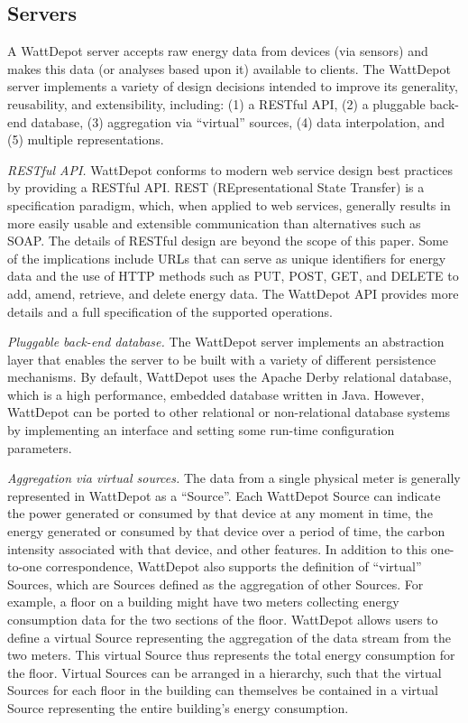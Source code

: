 \documentclass[conference]{IEEEtran}
\begin{document}
\subsection{Servers}

A WattDepot server accepts raw energy data from devices (via sensors) and
makes this data (or analyses based upon it) available to clients.  The
WattDepot server implements a variety of design decisions intended to
improve its generality, reusability, and extensibility, including: (1) a
RESTful API, (2) a pluggable back-end database, (3) aggregation via
``virtual'' sources, (4) data interpolation, and (5) multiple
representations.

{\em RESTful API.} WattDepot conforms to modern web service design best
practices by providing a RESTful API.  REST (REpresentational State
Transfer) \cite{REST} is a specification paradigm, which, when applied to
web services, generally results in more easily usable and extensible
communication than alternatives such as SOAP. The details of RESTful design
are beyond the scope of this paper. Some of the implications include
URLs that can serve as unique identifiers for energy data and the use of HTTP
methods such as PUT, POST, GET, and DELETE to add, amend, retrieve, and
delete energy data. The WattDepot API \cite{WattDepotAPI} provides more
details and a full specification of the supported operations.

{\em Pluggable back-end database.} The WattDepot server implements an
abstraction layer that enables the server to be built with a variety of
different persistence mechanisms.  By default, WattDepot uses the Apache
Derby relational database, which is a high performance, embedded database
written in Java.  However, WattDepot can be ported to other relational or
non-relational database systems by implementing an interface and setting some 
run-time configuration parameters. 

{\em Aggregation via virtual sources.} The data from a single physical
meter is generally represented in WattDepot as a ``Source''.  Each
WattDepot Source can indicate the power generated or consumed by that
device at any moment in time, the energy generated or consumed by that
device over a period of time, the carbon intensity associated with that
device, and other features.  In addition to this one-to-one correspondence,
WattDepot also supports the definition of ``virtual'' Sources, which are
Sources defined as the aggregation of other Sources.  For example, a floor
on a building might have two meters collecting energy consumption data for
the two sections of the floor.  WattDepot allows users to
define a virtual Source representing the aggregation of the data stream
from the two meters.  This virtual Source thus represents the total energy
consumption for the floor. Virtual Sources can be arranged in a hierarchy,
such that the virtual Sources for each floor in the building can themselves
be contained in a virtual Source representing the entire building's energy
consumption.
\end{document}
